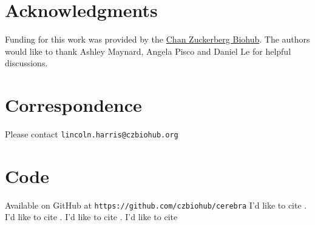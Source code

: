 \documentclass{article}
\begin{document}
\section*{Acknowledgments}
{Funding for this work was provided by the \href{https://www.czbiohub.org/}{Chan Zuckerberg Biohub}. The authors would like to thank Ashley Maynard, Angela Pisco and Daniel Le for helpful discussions.}

\section*{Correspondence}
{Please contact \texttt{lincoln.harris@czbiohub.org}}

\section*{Code}
{Available on GitHub at \texttt{https://github.com/czbiohub/cerebra} \newline
I'd like to cite \cite{maynard2019lung}. I'd like to cite \cite{nclsPkg}. I'd like to cite \cite{gatk}. I'd like to cite \cite{freebayes}
}



\end{document}
